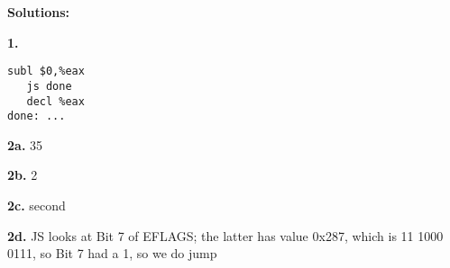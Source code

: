 \documentclass[twocolumn]{article}
\begin{document}
{\bf Solutions:}

{\bf 1.}

\begin{Verbatim}[fontsize=\relsize{-2}]
   subl $0,%eax
   js done
   decl %eax
done: ...
\end{Verbatim}

{\bf 2a.} 35

{\bf 2b.} 2

{\bf 2c.} second

{\bf 2d.} JS looks at Bit 7 of EFLAGS; the latter has value 0x287, which
is 11 1000 0111, so Bit 7 had a 1, so we do jump
\end{document}
